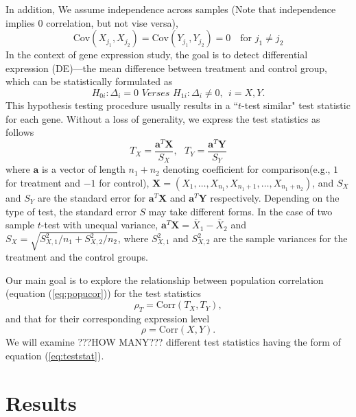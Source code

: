 \documentclass[12pt, a4paper]{article}
\newcommand{\cov}{\text{Cov}}
\newcommand{\cor}{\text{Corr}}
\begin{document}
	In addition, We assume independence across samples (Note that independence implies 0 correlation, but not vise versa), 
	\begin{equation}\label{eq:indepsamples}
	\cov(X_{j_1}, X_{j_2}) = \cov(Y_{j_1}, Y_{j_2}) = 0 \text{~~~for $j_1\neq j_2$}
	\end{equation}
	 In the context of gene expression study, the goal is to detect differential expression (DE)---the mean difference between treatment and control group, which can be statistically formulated as 
	 \begin{equation}\label{eq:hypotheses}
	 H_{0i}:  \Delta_i = 0 \textit{     Verses   }  H_{1i}: \Delta_i\neq 0 ,  ~~ i = X, Y.
	 \end{equation}
	This hypothesis testing procedure usually results in a ``$t$-test similar" test statistic for each gene. Without a loss of generality, we express the test statistics as follows
	\begin{equation}\label{eq:teststat}
	T_X = \dfrac{\bm a^T\bm X}{S_X},  ~~~ T_Y = \dfrac{\bm a^T \bm Y}{S_Y}
	\end{equation}  
	where $\bm a$ is a vector of length $n_1 + n_2$ denoting coefficient for comparison(e.g., $1$ for treatment and $-1$ for control), $\bm X = (X_1, \ldots, X_{n_1}, X_{n_1 +1}, \ldots, X_{n_1 + n_2})$, and  $S_X$ and $S_Y$ are the standard error for $\bm a^T\bm X$ and $\bm a^T\bm Y$ respectively. Depending on the type of test, the standard error $S$ may take different forms. In the case of two sample $t$-test with unequal variance, $\bm a^T\bm X = \bar{X}_1 - \bar{X}_2$ and $S_X = \sqrt{S_{X,1}^2/n_1 + S_{X,2}^2/n_2}$, where $ S_{X,1}^2$ and $S_{X,2}^2$ are the sample variances for the treatment and the control groups.
	
	Our main goal is to explore the relationship between population correlation (equation (\ref{eq:popucor})) for the test statistics 
	\begin{equation}
	\rho_T = \cor({T_X, T_Y}),
	\end{equation}  
	and that for their corresponding expression level 
	\begin{equation}
	\rho = \cor(X, Y). 
	\end{equation}
	We will examine ???HOW MANY??? different test statistics having the form of equation (\ref{eq:teststat}).%
	
	
	\section{Results}\label{section:tcorresults}
	
\end{document}
